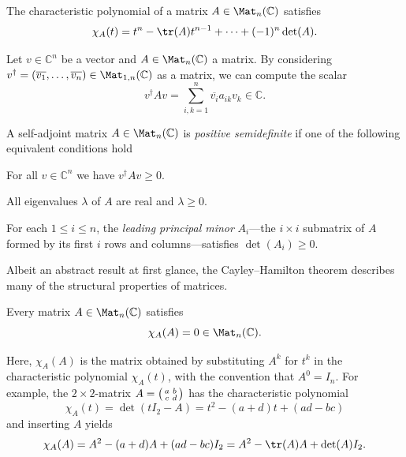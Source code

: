 \documentclass[a4paper,oneside, 12pt]{amsart}
\begin{document}
\begin{proposition}\label{prop:coeffs-of-char-poly}
  The characteristic polynomial of a matrix \(A \in \Mat_{n}( \mathbb{C})\) satisfies
  \begin{equation}
    \chi_{A}(t) = t^{n} - \tr(A)t^{n-1} + \dots + (-1)^{n}\det(A).
  \end{equation}
\end{proposition}
Let \(v\in \mathbb{C}^{n}\) be a vector and \(A \in \Mat_{n}( \mathbb{C})\) a matrix.
By considering \(v^{\dagger}= (\overline{v_{1}}, \dots , \overline{v_{n}})\in \Mat_{1,n}( \mathbb{C})\) as a matrix, we can compute the scalar
\begin{equation*}
  v^{\dagger}Av =\sum_{i,k=1}^{n} \overline{v_{i}}a_{ik}v_{k} \in \mathbb{C}.
\end{equation*}

\begin{definition}\label{def:positive-semidefinite}
  A self-adjoint matrix \(A\in \Mat_{n}( \mathbb{C})\) is \emph{positive semidefinite} if one of the following equivalent conditions hold
  \begin{thmlist}
    \item For all \(v\in \mathbb{C}^{n}\) we have \(v^{\dagger}Av \geq 0\).
    \item All eigenvalues \(\lambda\) of \(A\) are real and \(\lambda \geq 0\).
    \item For each \( 1 \leq i \leq n \), the \emph{leading principal minor} \( A_i \)---the \( i \times i \) submatrix of \( A \) formed by its first \( i \) rows and columns---satisfies \( \det(A_i) \geq 0 \).
  \end{thmlist}
\end{definition}

Albeit an abstract result at first glance, the Cayley--Hamilton theorem describes many of the structural properties of matrices.
\begin{theorem}\label{thm:cayley-hamilton}
  Every matrix \( A \in \Mat_n(\mathbb{C}) \) satisfies
  \begin{equation*}
    \chi_{A}(A) = 0 \in \Mat_{n}( \mathbb{C}).
  \end{equation*}
\end{theorem}
Here, \( \chi_A(A) \) is the matrix obtained by substituting \( A^k \) for \( t^k \) in the characteristic polynomial \( \chi_A(t) \), with the convention that \( A^0 = I_n \).
For example,  the \(2 \times 2\)-matrix \(A =\begin{psmallmatrix} a & b \\ c & d \end{psmallmatrix}\)
has the characteristic polynomial
\begin{equation*}
  \chi_A(t) = \det(t I_2 - A) = t^2 - (a + d)t + (ad - bc)
\end{equation*}
and inserting \(A\) yields
\begin{equation*}
  \chi_{A}(A) = A^{2} - (a + d) A + (ad-bc) I_{2} = A^{2} - \tr(A)A + \det(A)I_{2}.
\end{equation*}
\end{document}
